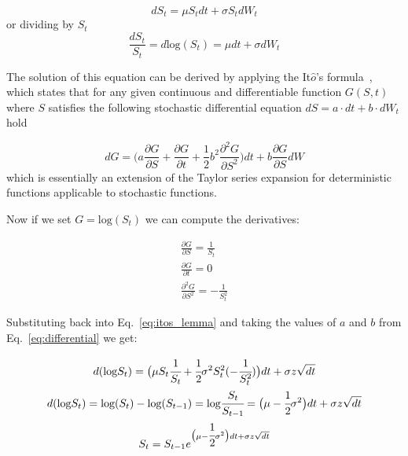 \begin{equation}
dS_t = \mu S_t dt + \sigma S_t dW_t
\label{eq:differential}
\end{equation}
or dividing by $S_t$
\begin{equation}
\frac{dS_t}{S_t} = d\textrm{log}(S_t) = \mu dt + \sigma dW_t
\end{equation}

The solution of this equation can be derived by applying the
It\(\hat{o}\)'s formula~\cite{bib:ito_lemma}, which states that for any given 
continuous and differentiable function 
\(G(S, t)\) where \(S\) satisfies the following stochastic differential
equation \(dS=a\cdot dt +b\cdot dW_t\) hold

\begin{equation}
dG=\big(a\frac{\partial G}{\partial S} + \frac{\partial G}{\partial t} + \frac{1}{2}b^2\frac{\partial^2 G}{\partial S^2} \big)dt + b \frac{\partial G}{\partial S}dW
\label{eq:itos_lemma}
\end{equation}
which is essentially an extension of the Taylor series expansion for deterministic functions
applicable to stochastic functions.

Now if we set \(G = \textrm{log}(S_t)\) we can compute the derivatives:

\begin{equation}
\begin{gathered}
\frac{\partial G}{\partial S} = \frac{1}{S_t}\\
\frac{\partial G}{\partial t} = 0\\
\frac{\partial^2 G}{\partial S^2} = -\frac{1}{S_t^{2}}
\end{gathered}
\end{equation}

Substituting back into Eq.~\ref{eq:itos_lemma} and taking the values of $a$ and $b$ from Eq.~\ref{eq:differential} we get:

\begin{equation}
\begin{gathered}
d(\textrm{log} S_t) = \big(\mu S_t \cfrac{1}{S_t} + \cfrac{1}{2}\sigma^2 S_t^2 (-\cfrac{1}{S_t^2})\big)dt + \sigma z\sqrt{dt}\\
d(\textrm{log} S_t) = \textrm{log} (S_t) - \textrm{log} (S_{t-1}) = \textrm{log} \cfrac{S_t}{S_{t-1}} = \big(\mu - \cfrac{1}{2}\sigma^2\big)dt + \sigma z\sqrt{dt}\\
S_t = S_{t-1}e^{\big(\mu - \cfrac{1}{2}\sigma^2\big)dt + \sigma z\sqrt{dt}}
\end{gathered}
\label{eq:gbm_solution}
\end{equation}

